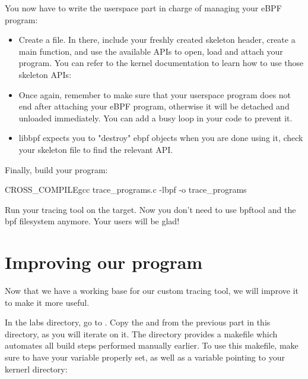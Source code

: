 You now have to write the userspace part in charge of managing your eBPF program:
\begin{itemize}
  \item Create a  file. In there, include your freshly created skeleton header, create a main function, and use the available APIs to open, load and attach your program. You can refer to the kernel documentation to learn how to use those skeleton APIs: 
  \item Once again, remember to make sure that your userspace program does not end after attaching your eBPF program, otherwise it will be detached and unloaded immediately. You can add a busy loop in your code to prevent it.
  \item libbpf expects you to "destroy" ebpf objects when you are done using it, check your skeleton file to find the relevant API.
\end{itemize}

Finally, build your program:
\begin{bashinput}
$ ${CROSS_COMPILE}gcc trace_programs.c -lbpf -o trace_programs
\end{bashinput}

Run your tracing tool on the target. Now you don't need to use bpftool and
the bpf filesystem anymore. Your users will be glad!

\section{Improving our program}

Now that we have a working base for our custom tracing tool, we will improve it
to make it more useful.

In the labs directory, go to . Copy the
 and  from the previous
part in this directory, as you will iterate on it. The directory provides a
makefile which automates all build steps performed manually earlier. To use
this makefile, make sure to have your  variable
properly set, as well as a  variable pointing to your kernerl
directory:

